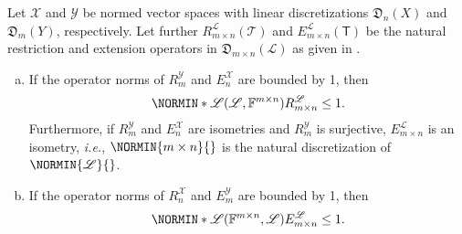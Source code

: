 \documentclass[a4paper]{paper}
\newcommand*{\SPC}[1]{{\ensuremath{\mathscr{#1}}}}
\newcommand*{\SPCL}{\SPC{L}}
\newcommand*{\SPCX}{\SPC{X}}
\newcommand*{\SPCY}{\SPC{Y}}
\newcommand*{\BLINOP}[2]{{\SPCL(#1, #2)}}
\newcommand*{\FIELD}{{\ensuremath{\mathbb{F}}}}
\newcommand*{\Fmxn}{{\ensuremath{\FIELD^{m \times n}}}}
\newcommand*{\OP}[1]{{\ensuremath{\mathcal{#1}}}}
\newcommand*{\OPT}{\OP{T}}
\newcommand{\DISCOP}[1]{{\ensuremath{\mathsf{#1}}}}
\newcommand*{\DISCOPT}{\DISCOP{T}}
\newcommand*{\EXT}[2]{\ensuremath{E_{#1}^{#2}}}
\newcommand*{\REST}[2]{\ensuremath{R_{#1}^{#2}}}
\newcommand*{\RnX}{{\ensuremath{\REST{n}{\SPC{X}}}}}
\newcommand*{\RmY}{{\ensuremath{\REST{m}{\SPC{Y}}}}}
\newcommand*{\EnX}{{\ensuremath{\EXT{n}{\SPC{X}}}}}
\newcommand*{\EmY}{{\ensuremath{\EXT{m}{\SPC{Y}}}}}
\newcommand*{\DISCR}[2]{{\ensuremath{\mathfrak{D}_{#1}(#2)}}}
\newcommand*{\DISCRnX}{\DISCR{n}{X}}
\newcommand*{\DISCRmY}{\DISCR{m}{Y}}
\newcommand*{\ie}{\textsl{i.e.}\xspace}
\begin{document}
\begin{lemma}
 \label{lemma:prop:norm:op_norm_est}
 Let $\SPCX$ and $\SPCY$ be normed vector spaces with linear discretizations $\DISCRnX$ and 
 $\DISCRmY$, respectively. Let further $\REST{m\times n}{\SPCL}(\OPT)$ and 
 $\EXT{m\times n}{\SPCL}(\DISCOPT)$ be the natural restriction and extension operators in 
 $\DISCR{m\times n}{\SPCL}$ as given in .
 \begin{enumerate}[(a)]
  \item \label{lemma:prop:norm:op_norm_est:a_rest}
  If the operator norms of $\RmY$ and $\EnX$ are bounded by 1, then
  \begin{equation*}
   \NORMIN*{\BLINOP{\SPCL}{\Fmxn}}{\REST{m\times n}{\SPCL}} \leq 1.
  \end{equation*}
  Furthermore, if $\RmY$ and $\EnX$ are isometries and $\RmY$ is surjective, $\EXT{m\times n}{\SPCL}$ is an 
  isometry, \ie, $\NORMIN{m\times n}{}$ is the natural discretization of $\NORMIN{\SPCL}{}$.
  
  \item \label{lemma:prop:norm:op_norm_est:b_ext}
  If the operator norms of $\RnX$ and $\EmY$ are bounded by 1, then
  \begin{equation*}
   \NORMIN*{\BLINOP{\Fmxn}{\SPCL}}{E_{m\times n}^{\SPCL}} \leq 1.
  \end{equation*}
 \end{enumerate}
\end{lemma}
\vspace{1em}
\end{document}
